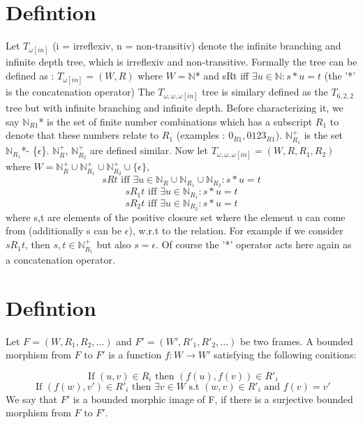 \documentclass[12pt, a4paper]{scrreprt}
\begin{document}
\section{Defintion}
Let $T_{\omega [in]}$ (i = irreflexiv, n = non-transitiv) denote the infinite branching and infinite depth tree, which is irreflexiv and non-transitive.
Formally the tree can be defined as : $T_{\omega [in]} = (W, R)$ where $W = \mathbb{N}$* and sRt iff $\exists u \in \mathbb{N} : s*u = t$ (the '*' is the concatenation operator) \newline \newline
The $T_{\omega,\omega,\omega [in]}$ tree is similary defined as the $T_{6,2,2}$ tree but with infinite branching and infinite depth. Before characterizing it, we say
$\mathbb{N}_{R1}$* is the set of finite number combinations which has a subscript $R_1$ to denote that these numbers relate to $R_1$  \newline 
(examples : $0_{R1}, 0123_{R1}$).
$\mathbb{N}^+_{R_1}$ is the set $\mathbb{N}_{R_1}$*- \{$\epsilon$\}. $\mathbb{N}^+_{R}$, $\mathbb{N}^+_{R_2}$ are defined similar. \newline \newline
Now let $T_{\omega,\omega,\omega [in]} = (W, R, R_1, R_2 )$ where $W = \mathbb{N}^+_{R} \cup \mathbb{N}^+_{R_1} \cup \mathbb{N}^+_{R_2} \cup \{ \epsilon\}$, 
$$sRt \mbox{ iff } \exists u \in \mathbb{N}_{R} \cup \mathbb{N}_{R_1} \cup \mathbb{N}_{R_2} : s*u = t$$
$$sR_1t \mbox { iff } \exists u \in \mathbb{N}_{R_1} : s * u = t$$
$$sR_2t \mbox { iff } \exists u \in \mathbb{N}_{R_2} : s * u = t$$
where s,t are elements of the positive closure set where the element u can come from (additionally s can be $\epsilon$), w.r.t to the relation. For example
if we consider $sR_1t$, then $s,t \in \mathbb{N}^+_{R_1}$ but also $s = \epsilon$. Of course the '*' operator acts here again as a concatenation operator.

\section{Defintion} 
Let $F = (W,R_1, R_2, ...)$ and $F' = (W', R'_1, R'_2, ...)$ be two frames. A bounded morphism from $F \mbox{ to } F'$ is a function
$f : W \rightarrow W'$ satisfying the following conitions: 

$$ \mbox{ If } (u,v) \in R_i  \mbox{ then }(f(u), f(v)) \in R'_i $$
$$ \mbox{ If } (f(w), v') \in R'_i \mbox{ then } \exists v \in W \mbox{ s.t } (w,v) \in R'_i \mbox{ and } f(v) = v'$$
We say that $F'$ is a bounded morphic image of F, if there is a surjective bounded morphism from $F \mbox{ to } F'$.
\end{document}

